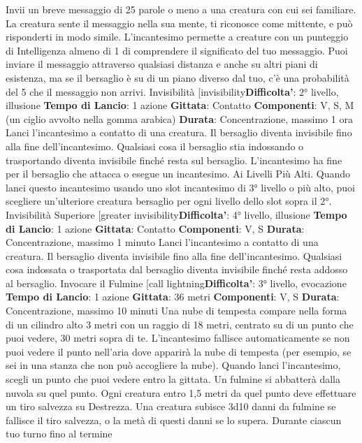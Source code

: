 \begin{multicols}{2}
Invii un breve messaggio di 25 parole o meno a una
creatura con cui sei familiare. La creatura sente il
messaggio nella sua mente, ti riconosce come mittente,
e può risponderti in modo simile. L’incantesimo
permette a creature con un punteggio di Intelligenza
almeno di 1 di comprendere il significato del tuo
messaggio.
Puoi inviare il messaggio attraverso qualsiasi distanza e
anche su altri piani di esistenza, ma se il bersaglio è su
di un piano diverso dal tuo, c’è una probabilità del 5%
che il messaggio non arrivi.
Invisibilità
[invisibility\textbf{Difficolta'}:
2° livello, illusione
\textbf{Tempo di Lancio}: 1 azione
\textbf{Gittata}: Contatto
\textbf{Componenti}: V, S, M (un ciglio avvolto nella gomma
arabica)
\textbf{Durata}: Concentrazione, massimo 1 ora
Lanci l’incantesimo a contatto di una creatura. Il
bersaglio diventa invisibile fino alla fine
dell’incantesimo. Qualsiasi cosa il bersaglio stia
indossando o trasportando diventa invisibile finché
resta sul bersaglio. L’incantesimo ha fine per il
bersaglio che attacca o esegue un incantesimo.
Ai Livelli Più Alti. Quando lanci questo incantesimo
usando uno slot incantesimo di 3° livello o più alto, puoi
scegliere un’ulteriore creatura bersaglio per ogni livello
dello slot sopra il 2°.
Invisibilità Superiore
[greater invisibility\textbf{Difficolta'}:
4° livello, illusione
\textbf{Tempo di Lancio}: 1 azione
\textbf{Gittata}: Contatto
\textbf{Componenti}: V, S
\textbf{Durata}: Concentrazione, massimo 1 minuto
Lanci l’incantesimo a contatto di una creatura. Il
bersaglio diventa invisibile fino alla fine
dell’incantesimo. Qualsiasi cosa indossata o trasportata
dal bersaglio diventa invisibile finché resta addosso al
bersaglio.
Invocare il Fulmine
[call lightning\textbf{Difficolta'}:
3° livello, evocazione
\textbf{Tempo di Lancio}: 1 azione
\textbf{Gittata}: 36 metri
\textbf{Componenti}: V, S
\textbf{Durata}: Concentrazione, massimo 10 minuti
Una nube di tempesta compare nella forma di un
cilindro alto 3 metri con un raggio di 18 metri, centrato
su di un punto che puoi vedere, 30 metri sopra di te.
L’incantesimo fallisce automaticamente se non puoi
vedere il punto nell’aria dove apparirà la nube di
tempesta (per esempio, se sei in una stanza che non
può accogliere la nube).
Quando lanci l’incantesimo, scegli un punto che puoi
vedere entro la gittata. Un fulmine si abbatterà dalla
nuvola su quel punto. Ogni creatura entro 1,5 metri da
quel punto deve effettuare un tiro salvezza su
Destrezza. Una creatura subisce 3d10 danni da fulmine
se fallisce il tiro salvezza, o la metà di questi danni se lo
supera. Durante ciascun tuo turno fino al termine

\end{multicols}

